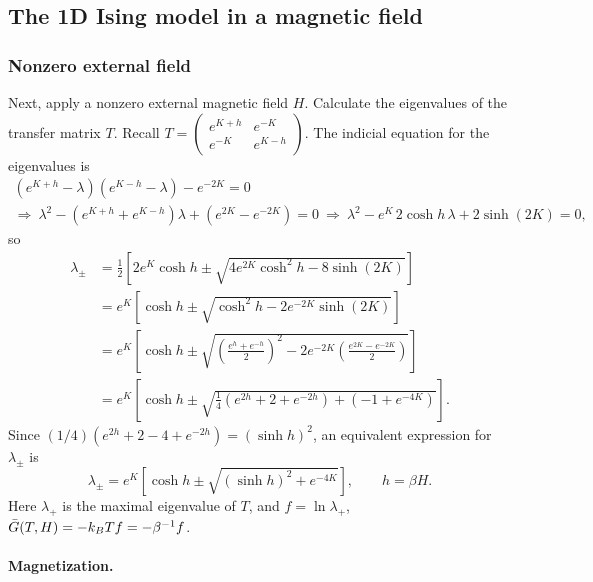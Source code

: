 \subsection{The 1D Ising model in a magnetic field}
\subsubsection*{Nonzero external field}

Next, apply a nonzero external magnetic field $H$. Calculate the eigenvalues of the transfer
matrix $T$. Recall
$T = \left(\begin{smallmatrix} e^{K+h} & e^{-K}\\ e^{-K} & e^{K-h}\end{smallmatrix}\right)$.
The indicial equation for the eigenvalues is
\begin{gather}
  (e^{K+h}-\lambda)(e^{K-h}-\lambda) - e^{-2K} = 0\nonumber\\
  \Rightarrow\ \lambda^2 - (e^{K+h}+e^{K-h})\lambda + (e^{2K}-e^{-2K}) = 0
  \ \Rightarrow\ \lambda^2 - e^K\,2\cosh h\,\lambda + 2\sinh(2K) = 0,
\end{gather}
so
\begin{align}
  \lambda_\pm &= \frac{1}{2}\left[2e^K\cosh h\pm\sqrt{4e^{2K}\cosh^2h - 8\sinh(2K)}\right]\nonumber\\
  &= e^K\left[\cosh h\pm\sqrt{\cosh^2h - 2e^{-2K}\sinh(2K)}\right]\nonumber\\
  &= e^K\left[\cosh h\pm\sqrt{\left(\frac{e^h+e^{-h}}{2}\right)^2 - 2e^{-2K}\left(\frac{e^{2K}-e^{-2K}}{2}\right)}\right]\nonumber\\
  &= e^K\left[\cosh h\pm\sqrt{\frac{1}{4}(e^{2h}+2+e^{-2h}) + (-1+e^{-4K})}\right].
\end{align}
Since $(1/4)(e^{2h}+2-4+e^{-2h}) = (\sinh h)^2$, an equivalent expression for $\lambda_\pm$
is
\begin{equation}
  \lambda_\pm = e^K\left[\cosh h\pm\sqrt{(\sinh h)^2+e^{-4K}}\right],\qquad h = \beta H .
\end{equation}
Here $\lambda_+$ is the maximal eigenvalue of $T$, and $f = \ln\lambda_+$,
$\bar G(T,H) = -k_{B} Tf = -\beta^{-1}f$.

\paragraph{Magnetization.}

